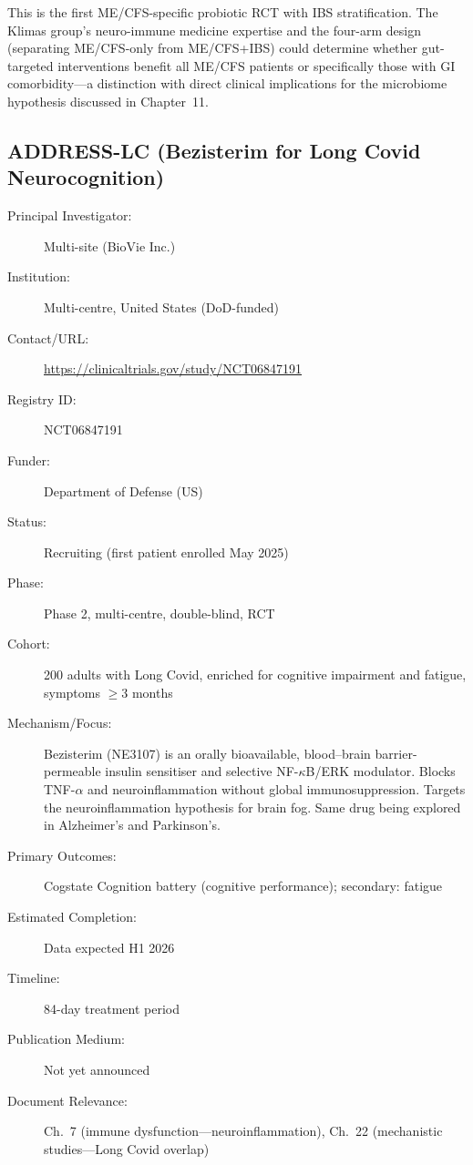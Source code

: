 This is the first ME/CFS-specific probiotic RCT with IBS stratification.
The Klimas group's neuro-immune medicine expertise and the four-arm design
(separating ME/CFS-only from ME/CFS+IBS) could determine whether gut-targeted
interventions benefit all ME/CFS patients or specifically those with GI
comorbidity---a distinction with direct clinical implications for the
microbiome hypothesis discussed in Chapter~11.

\subsection{ADDRESS-LC (Bezisterim for Long Covid Neurocognition)}
\label{sec:registry-address-lc}

\begin{description}
    \item[Principal Investigator:] Multi-site (BioVie Inc.)
    \item[Institution:] Multi-centre, United States (DoD-funded)
    \item[Contact/URL:] \url{https://clinicaltrials.gov/study/NCT06847191}
    \item[Registry ID:] NCT06847191
    \item[Funder:] Department of Defense (US)
    \item[Status:] Recruiting (first patient enrolled May 2025)
    \item[Phase:] Phase 2, multi-centre, double-blind, RCT
    \item[Cohort:] 200 adults with Long Covid, enriched for cognitive
        impairment and fatigue, symptoms $\geq$3 months
    \item[Mechanism/Focus:] Bezisterim (NE3107) is an orally bioavailable,
        blood--brain barrier-permeable insulin sensitiser and selective
        NF-$\kappa$B/ERK modulator.  Blocks TNF-$\alpha$ and
        neuroinflammation without global immunosuppression.  Targets the
        neuroinflammation hypothesis for brain fog.  Same drug being
        explored in Alzheimer's and Parkinson's.
    \item[Primary Outcomes:] Cogstate Cognition battery (cognitive
        performance); secondary: fatigue
    \item[Estimated Completion:] Data expected H1 2026
    \item[Timeline:] 84-day treatment period
    \item[Publication Medium:] Not yet announced
    \item[Document Relevance:] Ch.~7 (immune dysfunction---neuroinflammation),
        Ch.~22 (mechanistic studies---Long Covid overlap)
\end{description}

